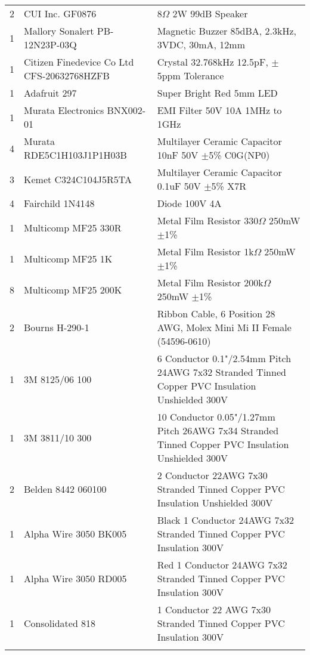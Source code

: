\begin{longtabu}{X[1,c,m] X[6,c,m] X[9,l,m]}
  2 & CUI Inc. GF0876 & 8$\Omega$ 2W 99dB Speaker \\
  1 & Mallory Sonalert PB-12N23P-03Q & Magnetic Buzzer 85dBA, 2.3kHz, 3VDC, 30mA, 12mm \\ \mrule

  1 & Citizen Finedevice Co Ltd CFS-20632768HZFB & Crystal 32.768kHz 12.5pF, $\pm$5ppm Tolerance \\
  1 & Adafruit 297 & Super Bright Red 5mm LED \\
  1 & Murata Electronics BNX002-01 & EMI Filter 50V 10A 1MHz to 1GHz \\
  4 & Murata RDE5C1H103J1P1H03B & Multilayer Ceramic Capacitor 10nF 50V $\pm$5\% C0G(NP0) \\
  3 & Kemet C324C104J5R5TA & Multilayer Ceramic Capacitor 0.1uF 50V $\pm$5\% X7R \\
  4 & Fairchild 1N4148 & Diode 100V 4A \\
  1 & Multicomp MF25 330R & Metal Film Resistor 330$\Omega$ 250mW $\pm$1\% \\
  1 & Multicomp MF25 1K & Metal Film Resistor 1k$\Omega$ 250mW $\pm$1\% \\
  8 & Multicomp MF25 200K & Metal Film Resistor 200k$\Omega$ 250mW $\pm$1\% \\ \mrule

  2 & Bourns H-290-1 & Ribbon Cable, 6 Position 28 AWG, Molex Mini Mi II Female (54596-0610) \\
  1 & 3M 8125/06 100 & 6 Conductor 0.1"/2.54mm Pitch 24AWG 7x32 Stranded Tinned Copper PVC Insulation Unshielded 300V \\
  1 & 3M 3811/10 300 & 10 Conductor 0.05"/1.27mm Pitch 26AWG 7x34 Stranded Tinned Copper PVC Insulation Unshielded 300V \\
  2 & Belden 8442 060100 & 2 Conductor 22AWG 7x30 Stranded Tinned Copper PVC Insulation Unshielded 300V \\
  1 & Alpha Wire 3050 BK005 & Black 1 Conductor 24AWG 7x32 Stranded Tinned Copper PVC Insulation 300V \\
  1 & Alpha Wire 3050 RD005 & Red 1 Conductor 24AWG 7x32 Stranded Tinned Copper PVC Insulation 300V \\
  1 & Consolidated 818 & 1 Conductor 22 AWG 7x30 Stranded Tinned Copper PVC Insulation 300V \\ \mrule


\end{longtabu}
